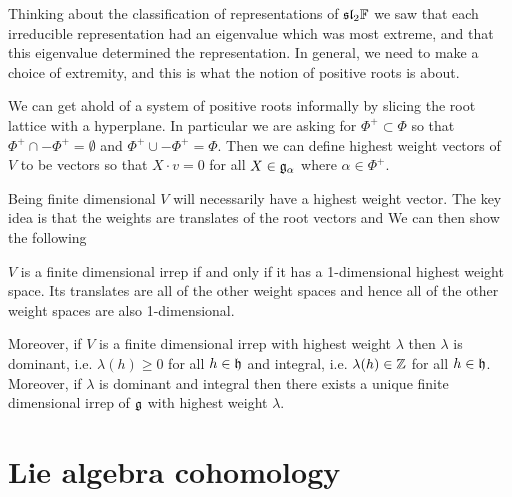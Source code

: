 \documentclass[12pt]{article}
\begin{document}
Thinking about the classification of representations of $\mathfrak{sl}_2\mathbb{F}$ we saw that each irreducible
representation had an eigenvalue which was most extreme, and that this eigenvalue determined
the representation. In general, we need to make a choice of extremity, and this is what the notion
of positive roots is about.

\hfill

We can get ahold of a system of positive roots informally by slicing the root lattice with a hyperplane.
In particular we are asking for $\Phi^+\subset \Phi$
so that $\Phi^+\cap -\Phi^+ = \emptyset$ and $\Phi^+\cup -\Phi^+ = \Phi$. Then we can define highest 
weight vectors of $V$ to be vectors so that $X\cdot v = 0$ for all $X\in\mathfrak{g}_\alpha$ where $\alpha\in\Phi^+$.

\hfill

Being finite dimensional $V$ will necessarily have a highest weight vector. The key idea is that
the weights are translates of the root vectors and 
 We can then show the following

\hfill

$V$ is a finite dimensional irrep if and only if it has a 1-dimensional highest weight space.
Its translates are all of the other weight spaces and hence all of the other weight spaces are also 1-dimensional.



Moreover, if $V$ is a finite dimensional irrep with highest weight $\lambda$ then $\lambda$ is dominant, i.e. $\lambda(h)\geq 0$ for all $h\in\mathfrak{h}$
and integral, i.e. $\lambda(h)\in\mathbb{Z}$ for all $h\in\mathfrak{h}$. Moreover, if $\lambda$ is dominant and integral then there exists 
a unique finite dimensional irrep of $\mathfrak{g}$ with highest weight $\lambda$.



\section{Lie algebra cohomology}
\end{document}
